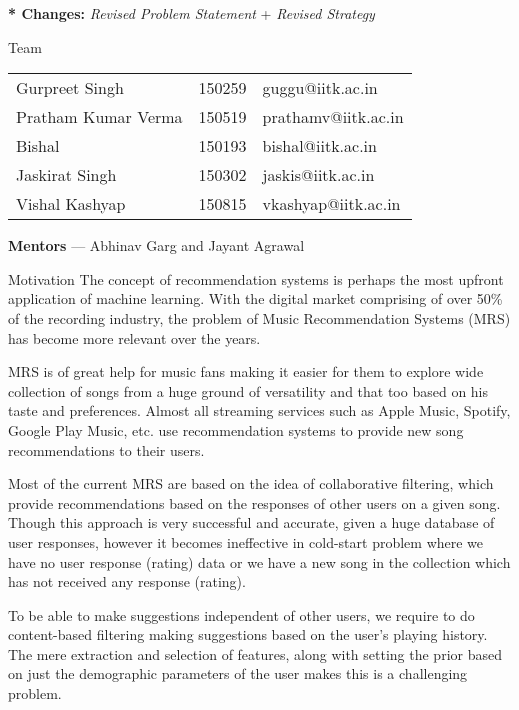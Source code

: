 \documentclass[11pt]{article}
\begin{document}

\textbf{* Changes:} \textit{Revised Problem Statement} + \textit{Revised Strategy}

\begin{psection}{Team}

    \begin{tabular}{@{}p{5cm} p{2cm} l}
        Gurpreet Singh      & 150259 & guggu@iitk.ac.in     \\
        Pratham Kumar Verma & 150519 & prathamv@iitk.ac.in  \\
        Bishal              & 150193 & bishal@iitk.ac.in    \\
        Jaskirat Singh      & 150302 & jaskis@iitk.ac.in    \\
        Vishal Kashyap      & 150815 & vkashyap@iitk.ac.in  \\
    \end{tabular}

    \nbr

    \textbf{Mentors} --- Abhinav Garg and Jayant Agrawal

\end{psection}


\begin{psection}{Motivation}
    The concept of recommendation systems is perhaps the most upfront application of machine learning. With the digital market comprising of over 50\% of the recording industry, the problem of Music Recommendation Systems (MRS) has become more relevant over the years. \br
    
    MRS is of great help for music fans making it easier for them to explore wide collection of songs from a huge ground of versatility and that too based on his taste and preferences. Almost all streaming services such as Apple Music, Spotify, Google Play Music, etc. use recommendation systems to provide new song recommendations to their users. \br
    
    Most of the current MRS are based on the idea of collaborative filtering, which provide recommendations based on the responses of other users on a given song. Though this approach is very successful and accurate, given a huge database of user responses, however it becomes ineffective in cold-start problem where we have no user response (rating) data or we have a new song in the collection which has not received any response (rating). \br
    
    To be able to make suggestions independent of other users, we require to do content-based filtering making suggestions based on the user’s playing history. The mere extraction and selection of features, along with setting the prior based on just the demographic parameters of the user makes this is a challenging problem.
\end{psection}
\end{document}
